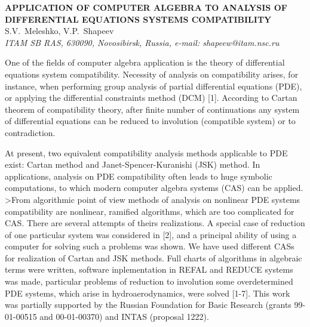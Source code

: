 \documentclass[11pt, draft]{article}
\begin{document}

\begin{center}
{\bf
APPLICATION OF COMPUTER ALGEBRA TO ANALYSIS OF DIFFERENTIAL
EQUATIONS SYSTEMS COMPATIBILITY
}\\
\vspace {0.3cm}
{S.V.~Meleshko, V.P.~Shapeev}\\
{\it \small ITAM SB RAS, 630090, Novosibirsk, Russia,
 e-mail: shapeew@itam.nsc.ru}
\end{center}
\vspace {0.6cm}

One of the fields of computer algebra application is
the theory of differential equations system compatibility.
Necessity of analysis on compatibility arises, for instance,
when performing group analysis of partial differential equations
(PDE), or applying the differential constraints method (DCM) [1].
According to Cartan theorem of compatibility theory,
after finite number of continuations
any system of differential equations can be
 reduced to involution (compatible system) or to contradiction.

At present, two equivalent compatibility analysis methods
 applicable to PDE exist: Cartan method and Janet-Spencer-Kuranishi
 (JSK) method.
 In applications, analysis on PDE compatibility often leads to
 huge symbolic computations, to which modern computer algebra systems (CAS)
 can be applied.
>From algorithmic point of view methods of analysis on nonlinear PDE systems
compatibility are nonlinear,
ramified algorithms, which are too complicated for CAS.
There are several attempts of theirs realizations.
 A special case
of reduction of one particular system was considered in [2], and a
principal ability of using a computer for solving such a problems
was shown.
We have used different CASs for realization of Cartan and JSK methods.
Full charts of algorithms in algebraic terms were written,
software inplementation in REFAL and REDUCE systems was made,
particular problems of reduction to involution some overdetermined PDE
systems, which
arise in hydroaerodynamics, were solved [1-7].
This work was partially supported by the Russian Foundation for Basic
Research (grants  99-01-00515 and 00-01-00370) and
INTAS (proposal 1222).
\end{document}

